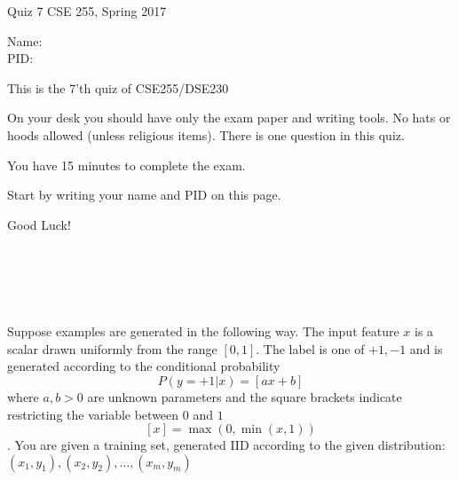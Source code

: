 \documentclass[10pt]{article}
\begin{document}
\setlength\parindent{0pt}
\thispagestyle{empty}

{\textbf \Large Quiz 7} \hfill CSE 255, Spring 2017
\\

\vspace{.1in}

Name: \underline{\hspace{3in}}
\\

PID: \underline{\hspace{3.15in}}

\vspace{.1in}

{\small \setlength\parindent{20pt}This is the 7'th quiz of CSE255/DSE230

On your desk you should have only the exam paper and writing tools.
No hats or hoods allowed (unless religious items).
There is one question in this quiz.

You have 15 minutes to complete the exam.

Start by writing your name and PID on this page.

Good Luck!}\\
\underline{\hspace{6in}}

~\\
~\\
\noindent

   Suppose examples are generated in the following way. The input
   feature $x$ is a scalar drawn uniformly from the range
   $[0,1]$. The label is one of ${+1,-1}$ and is generated
   according to the conditional probability
   $$P(y=+1 | x) = \left[ax +b\right]$$ where $a,b>0$ are unknown
   parameters and the square
   brackets indicate restricting the variable between $0$ and $1$
   $$[x] = \max(0,\min(x,1))$$. You are given a training set,
   generated IID according to the given distribution:
   $(x_1,y_1),(x_2,y_2),\ldots,(x_m,y_m)$
\end{document}
